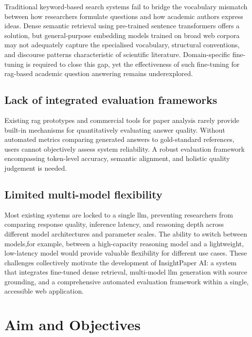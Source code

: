 Traditional keyword-based search systems fail to bridge the vocabulary mismatch between how researchers formulate questions and how academic authors express ideas. Dense semantic retrieval using pre-trained sentence transformers offers a solution, but general-purpose embedding models trained on broad web corpora may not adequately capture the specialised vocabulary, structural conventions, and discourse patterns characteristic of scientific literature. Domain-specific fine-tuning is required to close this gap, yet the effectiveness of such fine-tuning for \gls{rag}-based academic question answering remains underexplored.

\subsection{Lack of integrated evaluation frameworks}

Existing \gls{rag} prototypes and commercial tools for paper analysis rarely provide built-in mechanisms for quantitatively evaluating answer quality. Without automated metrics comparing generated answers to gold-standard references, users cannot objectively assess system reliability. A robust evaluation framework encompassing token-level accuracy, semantic alignment, and holistic quality judgement is needed.

\subsection{Limited multi-model flexibility}

Most existing systems are locked to a single \gls{llm}, preventing researchers from comparing response quality, inference latency, and reasoning depth across different model architectures and parameter scales. The ability to switch between models,for example, between a high-capacity reasoning model and a lightweight, low-latency model would provide valuable flexibility for different use cases.
\newline \newline These challenges collectively motivate the development of InsightPaper AI: a system that integrates fine-tuned dense retrieval, multi-model \gls{llm} generation with source grounding, and a comprehensive automated evaluation framework within a single, accessible web application.

\section{Aim and Objectives}



